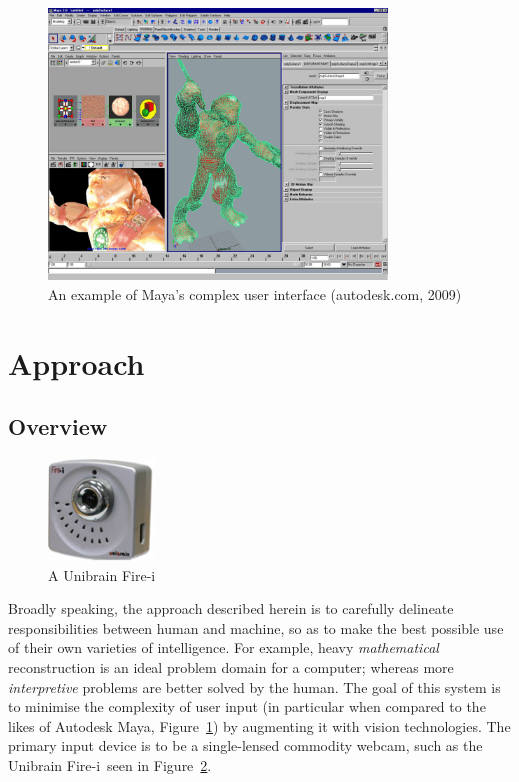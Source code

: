 \documentclass[a4paper,10pt]{article}
\begin{document}
\begin{figure}
  \begin{center}
    \includegraphics[width=340px]{maya}
  \end{center}
  \caption{An example of Maya's complex user interface (autodesk.com, 2009)}
  \label{maya}
\end{figure}

\section{Approach}
\subsection{Overview}

\begin{figure}
  \vspace{-37pt}
  \begin{center}
    \includegraphics[width=80pt]{firei}
  \end{center}
  \vspace{-20pt}
  \caption{A Unibrain Fire-i\texttrademark}
  \label{firei}
  \vspace{-15pt}
\end{figure}

Broadly speaking, the approach described herein is to carefully delineate responsibilities between human and machine, so as to make the best possible use of their own varieties of intelligence. For example, heavy \textit{mathematical} reconstruction is an ideal problem domain for a computer; whereas more \textit{interpretive} problems are better solved by the human. The goal of this system is to minimise the complexity of user input (in particular when compared to the likes of Autodesk Maya, Figure~\ref{maya}) by augmenting it with vision technologies. The primary input device is to be a single-lensed commodity webcam, such as the Unibrain Fire-i\texttrademark ~seen in Figure~\ref{firei}.
\end{document}
